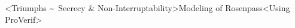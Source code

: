 





\interlude[1]<Triumphs \textasciitilde\ Secrecy \& Non-Interruptability>{Modeling of Rosenpass}<Using ProVerif>

